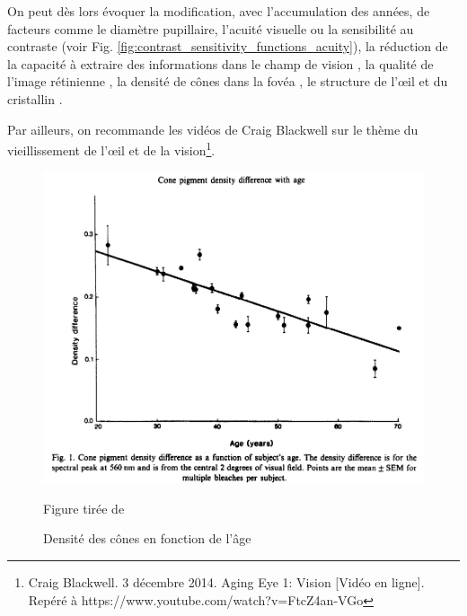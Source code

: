 	\par On peut dès lors évoquer la modification, avec l'accumulation des années, de facteurs comme le diamètre pupillaire, l'acuité visuelle ou la sensibilité au contraste \citep{owsley_contrast_1983} (voir Fig. \ref{fig:contrast_sensitivity_functions_acuity}), la réduction de la capacité à extraire des informations dans le champ de vision \citep{sekuler_effects_2000,ball_age_1988,roge_influence_2004, roge_deterioration_2009,gross_human_2008}, la qualité de l'image rétinienne \citep{artal_effects_1993}, la densité de cônes dans la fovéa \citep{kilbride_foveal_1986}, le structure de l'œil et du cristallin \citep{cook_aging_1994}.
	
	\par Par ailleurs, on recommande les vidéos de Craig Blackwell sur le thème du vieillissement de l'œil et de la vision\footnote{Craig Blackwell. 3 décembre 2014. Aging Eye 1: Vision [Vidéo en ligne]. Repéré à https://www.youtube.com/watch?v=FtcZ4an-VGo}.
	
	\begin{figure}[h]
		\centering
		\includegraphics[scale=.5]{Figures/ConeDensityAge}
		\caption{Densité des cônes en fonction de l'âge}{Figure tirée de \citep{kilbride_foveal_1986}}
		\label{fig:densite_cones_age}
	\end{figure}